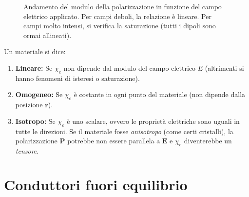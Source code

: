 \documentclass[a4paper,11pt]{report}
\begin{document}
\begin{figure}[htbp]
    \centering
    \caption{Andamento del modulo della polarizzazione in funzione del campo elettrico applicato. Per campi deboli, la relazione è lineare. Per campi molto intensi, si verifica la saturazione (tutti i dipoli sono ormai allineati).}
    \label{fig:suscettibilita_grafico}
\end{figure}

Un materiale si dice:
\begin{enumerate}
    \item \textbf{Lineare:} Se $\chi_e$ non dipende dal modulo del campo elettrico $E$ (altrimenti si hanno fenomeni di isteresi o saturazione).
    \item \textbf{Omogeneo:} Se $\chi_e$ è costante in ogni punto del materiale (non dipende dalla posizione $\bm{r}$).
    \item \textbf{Isotropo:} Se $\chi_e$ è uno scalare, ovvero le proprietà elettriche sono uguali in tutte le direzioni. Se il materiale fosse \textit{anisotropo} (come certi cristalli), la polarizzazione $\bm{P}$ potrebbe non essere parallela a $\bm{E}$ e $\chi_e$ diventerebbe un \textit{tensore}.
\end{enumerate}



\section{Conduttori fuori equilibrio}
\end{document}
